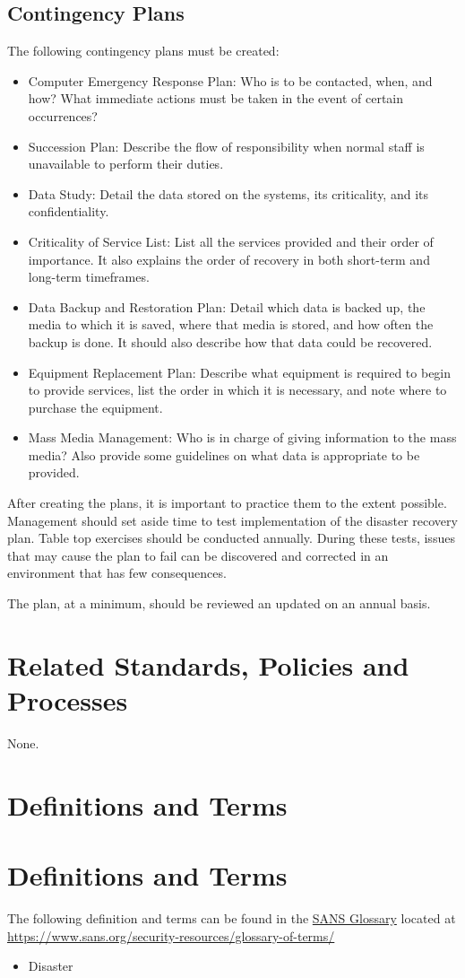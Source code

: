 \subsection{Contingency Plans}
The following contingency plans must be created:
\begin{itemize}
\item{Computer Emergency Response Plan}:
Who is to be contacted, when, and how?  
What immediate actions must be taken in the event of certain occurrences?
\item{Succession Plan}:
Describe the flow of responsibility when normal staff is unavailable to perform their duties.
\item{Data Study}:
Detail the data stored on the systems, its criticality, and its confidentiality.
\item{Criticality of Service List}:
List all the services provided and their order of importance.  
It also explains the order of recovery in both short-term and long-term timeframes.
\item{Data Backup and Restoration Plan}:
Detail which data is backed up, the media to which it is saved, where that media is stored, and how often the backup is done.  
It should also describe how that data could be recovered.
\item{Equipment Replacement Plan}:
Describe what equipment is required to begin to provide services, list the order in which it is necessary, and note where to purchase the equipment.
\item{Mass Media Management}:
Who is in charge of giving information to the mass media?  
Also\ins{,} provide some guidelines on what data is appropriate to be provided.
\end{itemize}
After creating the plans, it is important to practice them to the extent possible.  
Management should set aside time to test implementation of the disaster recovery plan.  
Table top exercises should be conducted annually.  
During these tests, issues that may cause the plan to fail can be discovered and corrected in an environment that has few consequences.

The plan, at a minimum, should be reviewed an updated on an annual basis.
\CommonPolicyCompliance
\section{Related Standards, Policies\oxford{} and Processes}
None.
\section{Definitions and Terms}
\section{Definitions and Terms}
The following definition and terms can be found in the \href{https://www.sans.org/security-resources/glossary-of-terms/}{SANS Glossary} located at \url{https://www.sans.org/security-resources/glossary-of-terms/}
\begin{itemize}
\item
Disaster
\end{itemize}
\CommonRevisionHistory
